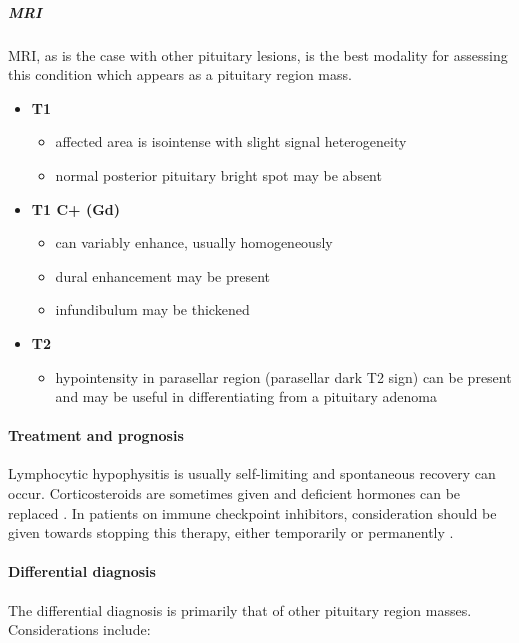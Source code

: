 \subparagraph{MRI}

MRI, as is the case with other pituitary lesions, is the best modality for assessing this condition which appears as a pituitary region mass.

\begin{itemize}
	\item
	\textbf{T1}
	
	\begin{itemize}
		\item
		affected area is isointense with slight signal heterogeneity
		\item
		normal posterior pituitary bright spot may be absent 
	\end{itemize}
	\item
	\textbf{T1 C+ (Gd)}
	
	\begin{itemize}
		\item
		can variably enhance, usually homogeneously 
		\item
		dural enhancement may be present 
		\item
		infundibulum may be thickened 
	\end{itemize}
	\item
	\textbf{T2}
	
	\begin{itemize}
		\item
		hypointensity in parasellar region (parasellar dark T2 sign) can be present and may be useful in differentiating from a pituitary adenoma 
	\end{itemize}
\end{itemize}


\paragraph{Treatment and prognosis}

Lymphocytic hypophysitis is usually self-limiting and spontaneous recovery can occur. Corticosteroids are sometimes given and deficient hormones can be replaced . In patients on immune checkpoint inhibitors, consideration should be given towards stopping this therapy, either temporarily or permanently .


\paragraph{Differential diagnosis}

The differential diagnosis is primarily that of other pituitary region masses. Considerations include:

